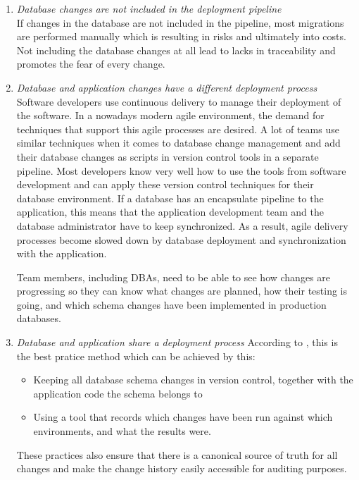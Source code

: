 \begin{enumerate}
	\item \textit{Database changes are not included in the deployment pipeline}\\
	If changes in the database are not included in the pipeline, most migrations are performed manually which is resulting in risks and ultimately into costs. Not including the database changes at all lead to lacks in traceability and promotes the fear of every change.
	
	\item \textit{Database and application changes have a different deployment process}\\
	Software developers use continuous delivery to manage their deployment of the software. In a nowadays modern agile environment, the demand for techniques that support this agile processes are desired. A lot of teams use similar techniques when it comes to database change management and add their database changes as scripts in version control tools in a separate pipeline. Most developers know very well how to use the tools from software development and can apply these version control techniques for their database environment. If a database has an encapsulate pipeline to the application, this means that the application development team and the database administrator have to keep synchronized. As a result, agile delivery processes become slowed down by database deployment and synchronization with the application.
	
	Team members, including DBAs, need to be able to see how changes are progressing so they can know what changes are planned, how their testing is going, and which schema changes have been implemented in production databases.
	
	\item \textit{Database and application share a deployment process}
	According to  \cite{GoogleDevOps2022}, this is the best pratice method which can be achieved by this:
	\begin{itemize}
		\item Keeping all database schema changes in version control, together with the application code the schema belongs to
		\item Using a tool that records which changes have been run against which environments, and what the results were.
	\end{itemize}
	These practices also ensure that there is a canonical source of truth for all changes and make the change history easily accessible for auditing purposes.

\end{enumerate}



